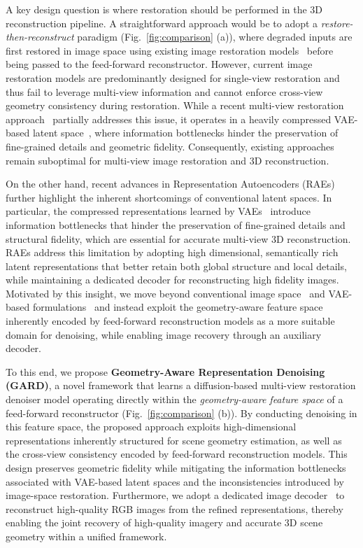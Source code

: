 A key design question is where restoration should be performed in the 3D reconstruction pipeline. A straightforward approach would be to adopt a \textit{restore-then-reconstruct} paradigm (Fig.~\ref{fig:comparison} (a)), where degraded inputs are first restored in image space using existing image restoration models~\cite{zamir2022restormer, conde2024high, chen2023hierarchical, liang2024vrt, Youk_2024_CVPR, mao2025sir, zamfir2024complexityexperts} before being passed to the feed-forward reconstructor. However, current image restoration models are predominantly designed for single-view restoration and thus fail to leverage multi-view information and cannot enforce cross-view geometry consistency during restoration. While a recent multi-view restoration approach~\cite{mao2025sir} partially addresses this issue, it operates in a heavily compressed VAE-based latent space~\cite {kingma2013auto}, where information bottlenecks hinder the preservation of fine-grained details and geometric fidelity. Consequently, existing approaches remain suboptimal for multi-view image restoration and 3D reconstruction.

On the other hand, recent advances in Representation Autoencoders (RAEs)~\cite{zheng2025diffusion, tong2026scaling, kumar2026learning} further highlight the inherent shortcomings of conventional latent spaces. In particular, the compressed representations learned by VAEs~\cite{kingma2013auto, yao2025reconstruction} introduce information bottlenecks that hinder the preservation of fine-grained details and structural fidelity, which are essential for accurate multi-view 3D reconstruction. RAEs address this limitation by adopting high dimensional, semantically rich latent representations that better retain both global structure and local details, while maintaining a dedicated decoder for reconstructing high fidelity images. Motivated by this insight, we move beyond conventional image space~\cite{zamir2022restormer, chen2023hierarchical, conde2024high, liang2024vrt, Youk_2024_CVPR} and VAE-based formulations~\cite{mao2025sir} and instead exploit the geometry-aware feature space inherently encoded by feed-forward reconstruction models as a more suitable domain for denoising, while enabling image recovery through an auxiliary decoder.

To this end, we propose \textbf{Geometry-Aware Representation Denoising (GARD)}, a novel framework that learns a diffusion-based multi-view restoration denoiser model operating directly within the \textit{geometry-aware feature space} of a feed-forward reconstructor (Fig.~\ref{fig:comparison} (b)). By conducting denoising in this feature space, the proposed approach exploits high-dimensional representations inherently structured for scene geometry estimation, as well as the cross-view consistency encoded by feed-forward reconstruction models. This design preserves geometric fidelity while mitigating the information bottlenecks associated with VAE-based latent spaces and the inconsistencies introduced by image-space restoration. Furthermore, we adopt a dedicated image decoder~\cite{jang2026gld} to reconstruct high-quality RGB images from the refined representations, thereby enabling the joint recovery of high-quality imagery and accurate 3D scene geometry within a unified framework.

